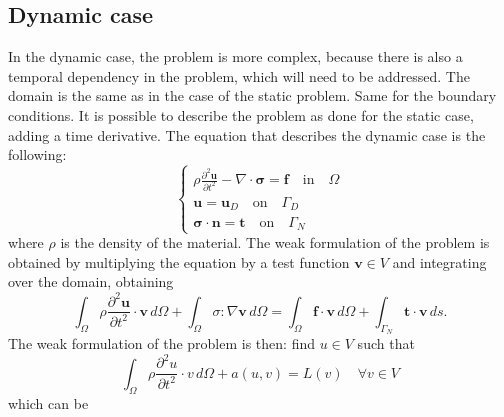 \subsection{Dynamic case}
In the dynamic case, the problem is more complex, because there is also a temporal dependency in the problem, which will need to be addressed. The domain is the same as in the case of the static problem. Same for the boundary conditions. It is possible to describe the problem as done for the static case, adding a time derivative.
The equation that describes the dynamic case is the following:
\begin{equation}
    \begin{cases}
        \rho \frac{\partial^2 \bm{u}}{\partial t^2} - \nabla \cdot \bm{\sigma} = \bm{f} \quad \text{in} \quad \Omega \\
        \bm{u} = \bm{u}_D \quad \text{on} \quad \Gamma_D \\
        \bm{\sigma} \cdot \bm{n} = \bm{t} \quad \text{on} \quad \Gamma_N
    \end{cases}
\label{eq:dynamic_problem}
\end{equation}
where \( \rho \) is the density of the material. The weak formulation of the problem is obtained by multiplying the equation by a test function \( \bm{v} \in V \) and integrating over the domain, obtaining
\begin{equation}
    \int_{\Omega} \rho \frac{\partial^2 \bm{u}}{\partial t^2} \cdot \bm{v} \, d\Omega + \int_{\Omega} \sigma : \nabla \bm{v} \, d\Omega = \int_{\Omega} \bm{f} \cdot \bm{v} \, d\Omega + \int_{\Gamma_N} \bm{t} \cdot \bm{v} \, ds.
    \label{eq:dynamic_weak_formulation}
\end{equation}
The weak formulation of the problem is then: find \(u \in V\) such that
\begin{equation}
    \int_{\Omega} \rho \frac{\partial^2 u}{\partial t^2} \cdot v \, d\Omega +  a(u,v) = L(v) \quad \forall v \in V
\end{equation}
which can be 
         